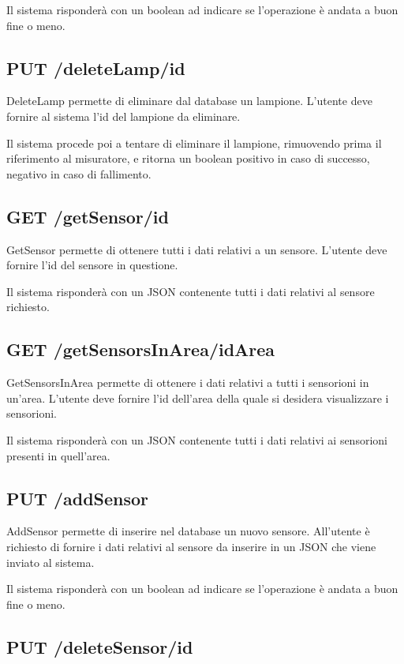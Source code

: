 Il sistema risponderà con un boolean ad indicare se l'operazione è andata a buon fine o meno.

\subsection{ PUT /deleteLamp/id}

DeleteLamp permette di eliminare dal database un lampione. L'utente deve fornire al sistema l'id del lampione da eliminare.

Il sistema procede poi a tentare di eliminare il lampione, rimuovendo prima il riferimento al misuratore, e ritorna un boolean positivo in caso di successo, negativo in caso di fallimento.

\subsection{ GET /getSensor/id}

GetSensor permette di ottenere tutti i dati relativi a un sensore. L'utente deve fornire l'id del sensore in questione.

Il sistema risponderà con un JSON contenente tutti i dati relativi al sensore richiesto.

\subsection{ GET /getSensorsInArea/idArea}

GetSensorsInArea permette di ottenere i dati relativi a tutti i sensorioni in un'area. L'utente deve fornire l'id dell'area della quale si desidera visualizzare i sensorioni.

Il sistema risponderà con un JSON contenente tutti i dati relativi ai sensorioni presenti in quell'area.

\subsection{ PUT /addSensor}

AddSensor permette di inserire nel database un nuovo sensore. All'utente è richiesto di fornire i dati relativi al sensore da inserire in un JSON che viene inviato al sistema.

Il sistema risponderà con un boolean ad indicare se l'operazione è andata a buon fine o meno.

\subsection{ PUT /deleteSensor/id}

